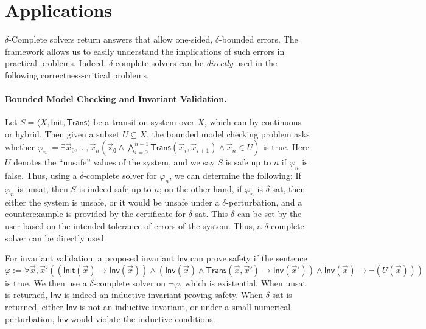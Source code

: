 \documentclass[envcountsect]{llncs}
\begin{document}
\section{Applications}\label{app}
$\delta$-Complete solvers return answers that allow one-sided, $\delta$-bounded errors. The framework allows us to easily understand the implications of such errors in practical problems. Indeed, $\delta$-complete solvers can be {\em directly} used in the following correctness-critical problems. 
\paragraph{Bounded Model Checking and Invariant Validation.} Let $S=\langle X, \mathsf{Init}, \mathsf{Trans}\rangle$ be a transition system over $X$, which can by continuous or hybrid. Then given a subset $U\subseteq X$, the bounded model checking problem asks whether $\varphi_n:= \exists \vec x_0,...,\vec x_n(\mathsf{\vec x_0}\wedge \bigwedge_{i=0}^{n-1} \mathsf{Trans}(\vec x_i, \vec x_{i+1}) \wedge \vec x_n\in U)$ is true. Here $U$ denotes the ``unsafe'' values of the system, and we say $S$ is safe up to $n$ if $\varphi_n$ is false. Thus, using a $\delta$-complete solver for $\varphi_n$, we can determine the following: If $\varphi_n$ is {\sf unsat}, then $S$ is indeed safe up to $n$; on the other hand, if $\varphi_n$ is {\sf $\delta$-sat}, then either the system is unsafe, or it would be unsafe under a $\delta$-perturbation, and a counterexample is provided by the certificate for {\sf $\delta$-sat}. This $\delta$ can be set by the user based on the intended tolerance of errors of the system. Thus, a $\delta$-complete solver can be directly used. 

For invariant validation, a proposed invariant $\mathsf{Inv}$ can prove safety if the sentence $\varphi:=\forall\vec x,\vec x'((\mathsf{Init}(\vec x)\rightarrow \mathsf{Inv}(\vec x))\wedge (\mathsf{Inv}(\vec x)\wedge\mathsf{Trans}(\vec x, \vec x')\rightarrow\mathsf{Inv}(\vec x'))\wedge \mathsf{Inv}(\vec x)\rightarrow \neg(U(\vec x)))$ is true. We then use a $\delta$-complete solver on $\neg\varphi$, which is existential. When {\sf unsat} is returned, $\mathsf{Inv}$ is indeed an inductive invariant proving safety. When {\sf $\delta$-sat} is returned, either $\mathsf{Inv}$ is not an inductive invariant, or under a small numerical perturbation, $\mathsf{Inv}$ would violate the inductive conditions.
\end{document}

